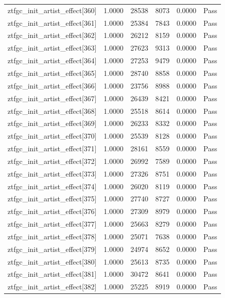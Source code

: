 \begin{table}[htbp]
\begin{tabular}{llrrll}
ztfgc\_init\_artist\_effect[360] & 1.0000 & 28538 & 8073 & 0.0000 & Pass \\
ztfgc\_init\_artist\_effect[361] & 1.0000 & 25384 & 7843 & 0.0000 & Pass \\
ztfgc\_init\_artist\_effect[362] & 1.0000 & 26212 & 8159 & 0.0000 & Pass \\
ztfgc\_init\_artist\_effect[363] & 1.0000 & 27623 & 9313 & 0.0000 & Pass \\
ztfgc\_init\_artist\_effect[364] & 1.0000 & 27253 & 9479 & 0.0000 & Pass \\
ztfgc\_init\_artist\_effect[365] & 1.0000 & 28740 & 8858 & 0.0000 & Pass \\
ztfgc\_init\_artist\_effect[366] & 1.0000 & 23756 & 8988 & 0.0000 & Pass \\
ztfgc\_init\_artist\_effect[367] & 1.0000 & 26439 & 8421 & 0.0000 & Pass \\
ztfgc\_init\_artist\_effect[368] & 1.0000 & 25518 & 8614 & 0.0000 & Pass \\
ztfgc\_init\_artist\_effect[369] & 1.0000 & 26233 & 8332 & 0.0000 & Pass \\
ztfgc\_init\_artist\_effect[370] & 1.0000 & 25539 & 8128 & 0.0000 & Pass \\
ztfgc\_init\_artist\_effect[371] & 1.0000 & 28161 & 8559 & 0.0000 & Pass \\
ztfgc\_init\_artist\_effect[372] & 1.0000 & 26992 & 7589 & 0.0000 & Pass \\
ztfgc\_init\_artist\_effect[373] & 1.0000 & 27326 & 8751 & 0.0000 & Pass \\
ztfgc\_init\_artist\_effect[374] & 1.0000 & 26020 & 8119 & 0.0000 & Pass \\
ztfgc\_init\_artist\_effect[375] & 1.0000 & 27740 & 8727 & 0.0000 & Pass \\
ztfgc\_init\_artist\_effect[376] & 1.0000 & 27309 & 8979 & 0.0000 & Pass \\
ztfgc\_init\_artist\_effect[377] & 1.0000 & 25663 & 8279 & 0.0000 & Pass \\
ztfgc\_init\_artist\_effect[378] & 1.0000 & 25071 & 7638 & 0.0000 & Pass \\
ztfgc\_init\_artist\_effect[379] & 1.0000 & 24974 & 8652 & 0.0000 & Pass \\
ztfgc\_init\_artist\_effect[380] & 1.0000 & 25613 & 8735 & 0.0000 & Pass \\
ztfgc\_init\_artist\_effect[381] & 1.0000 & 30472 & 8641 & 0.0000 & Pass \\
ztfgc\_init\_artist\_effect[382] & 1.0000 & 25225 & 8919 & 0.0000 & Pass \\

\end{tabular}
\end{table}
